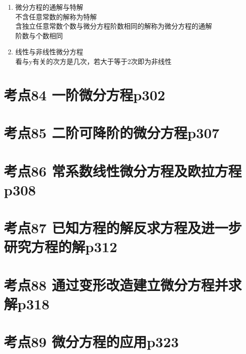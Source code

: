 \begin{enumerate}
    \item 微分方程的通解与特解\\
        不含任意常数的解称为特解\\
        含独立任意常数个数与微分方程阶数相同的解称为微分方程的通解\\
        阶数与个数相同
    \item 线性与非线性微分方程\\
    看与y有关的次方是几次，若大于等于2次即为非线性

\end{enumerate}

\section{考点84 一阶微分方程p302}

\section{考点85 二阶可降阶的微分方程p307}

\section{考点86 常系数线性微分方程及欧拉方程p308}

\section{考点87 已知方程的解反求方程及进一步研究方程的解p312}

\section{考点88 通过变形改造建立微分方程并求解p318}

\section{考点89 微分方程的应用p323}

